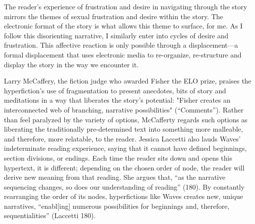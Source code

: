 \documentclass[11pt]{article}
\begin{document}
The reader’s experience of frustration and desire in navigating
through the story mirrors the themes of sexual frustration and desire
within the story. The electronic format of the story is what allows
this theme to surface, for me. As I follow this disorienting
narrative, I similarly enter into cycles of desire and
frustration. This affective reaction is only possible through a
displacement---a formal displacement that uses electronic media to
re-organize, re-structure and display the story in the way we
encounter it.

Larry McCaffery, the fiction judge who awarded Fisher the ELO prize,
praises the hyperfiction’s use of fragmentation to present anecdotes,
bits of story and meditations in a way that liberates the story’s
potential: "Fisher creates an interconnected web of branching,
narrative possibilities" (“Comments”). Rather than feel paralyzed by
the variety of options, McCafferty regards such options as liberating
the traditionally pre-determined text into something more malleable,
and therefore, more relatable, to the reader. Jessica Laccetti also
lauds Waves’ indeterminate reading experience, saying that it cannot
have defined beginnings, section divisions, or endings. Each time the
reader sits down and opens this hypertext, it is different; depending
on the chosen order of node, the reader will derive new meaning from
that reading. She argues that, “as the narrative sequencing changes,
so does our understanding of reading” (180). By constantly rearranging
the order of its nodes, hyperfictions like Waves creates new, unique
narratives, “enabl[ing] numerous possibilities for beginnings and,
therefore, sequentialities” (Laccetti 180).
\end{document}
